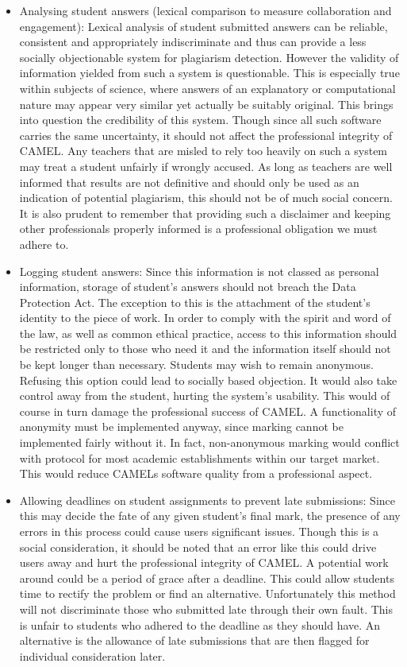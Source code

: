 	\begin{itemize}
		\item Analysing student answers (lexical comparison to measure collaboration and engagement): Lexical analysis of student submitted answers can be reliable, consistent and appropriately indiscriminate and thus can provide a less socially objectionable system for plagiarism detection.
			However the validity of information yielded from such a system is questionable. This is especially true within subjects of science, where answers of an explanatory or computational nature may appear very similar yet actually be suitably original. This brings into question the credibility of this system. Though since all such software carries the same uncertainty, it should not affect the professional integrity of CAMEL.
			Any teachers that are misled to rely too heavily on such a system may treat a student unfairly if wrongly accused. As long as teachers are well informed that results are not definitive and should only be used as an indication of potential plagiarism, this should not be of much social concern. It is also prudent to remember that providing such a disclaimer and keeping other professionals properly informed is a professional obligation we must adhere to.

		\item Logging student answers: Since this information is not classed as personal information, storage of student’s answers should not breach the Data Protection Act. The exception to this is the attachment of the student’s identity to the piece of work. In order to comply with the spirit and word of the law, as well as common ethical practice, access to this information should be restricted only to those who need it and the information itself should not be kept longer than necessary.
			Students may wish to remain anonymous. Refusing this option could lead to socially based objection. It would also take control away from the student, hurting the system’s usability. This would of course in turn damage the professional success of CAMEL.
			A functionality of anonymity must be implemented anyway, since marking cannot be implemented fairly without it. In fact, non-anonymous marking would conflict with protocol for most academic establishments within our target market. This would reduce CAMELs software quality from a professional aspect.

		\item Allowing deadlines on student assignments to prevent late submissions: Since this may decide the fate of any given student’s final mark, the presence of any errors in this process could cause users significant issues.
			Though this is a social consideration, it should be noted that an error like this could drive users away and hurt the professional integrity of CAMEL.
			A potential work around could be a period of grace after a deadline. This could allow students time to rectify the problem or find an alternative. Unfortunately this method will not discriminate those who submitted late through their own fault. This is unfair to students who adhered to the deadline as they should have.
			An alternative is the allowance of late submissions that are then flagged for individual consideration later.
	\end{itemize}
